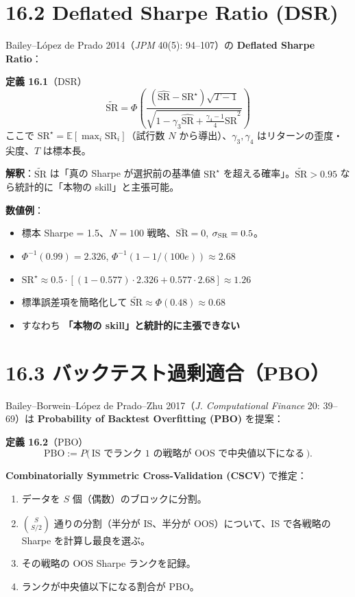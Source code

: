 \documentclass[11pt,a4paper]{report}
\begin{document}
\section{16.2 Deflated Sharpe Ratio (DSR)}

Bailey–López de Prado 2014（\emph{JPM} 40(5): 94–107）の \textbf{Deflated Sharpe Ratio}：

\textbf{定義 16.1}（DSR） \[ \boxed{\; \widetilde{\mathrm{SR}} = \Phi\!\left( \frac{(\widehat{\mathrm{SR}} - \mathrm{SR}^\star) \sqrt{T - 1}}{\sqrt{1 - \gamma_3 \widehat{\mathrm{SR}} + \tfrac{\gamma_4 - 1}{4} \widehat{\mathrm{SR}}^2}}\right) \;} \] ここで $\mathrm{SR}^\star = \mathbb{E}[\max_i \mathrm{SR}_i]$（試行数 $N$ から導出）、$\gamma_3, \gamma_4$ はリターンの歪度・尖度、$T$ は標本長。

\textbf{解釈}：$\widetilde{\mathrm{SR}}$ は「真の Sharpe が選択前の基準値 $\mathrm{SR}^\star$ を超える確率」。$\widetilde{\mathrm{SR}} > 0.95$ なら統計的に「本物の skill」と主張可能。

\textbf{数値例}：
\begin{itemize}
\item 標本 Sharpe = 1.5、$N = 100$ 戦略、$\bar{\mathrm{SR}} = 0$, $\sigma_{\rm SR} = 0.5$。
\item $\Phi^{-1}(0.99) = 2.326$, $\Phi^{-1}(1 - 1/(100 e)) \approx 2.68$
\item $\mathrm{SR}^\star \approx 0.5 \cdot [(1 - 0.577) \cdot 2.326 + 0.577 \cdot 2.68] \approx 1.26$
\item 標準誤差項を簡略化して $\widetilde{\mathrm{SR}} \approx \Phi(0.48) \approx 0.68$
\item すなわち \textbf{「本物の skill」と統計的に主張できない}
\end{itemize}

\section{16.3 バックテスト過剰適合（PBO）}

Bailey–Borwein–López de Prado–Zhu 2017（\emph{J. Computational Finance} 20: 39–69）は \textbf{Probability of Backtest Overfitting (PBO)} を提案：

\textbf{定義 16.2}（PBO） \[ \mathrm{PBO} := P\bigl(\,\text{IS でランク 1 の戦略が OOS で中央値以下になる}\,\bigr). \]

\textbf{Combinatorially Symmetric Cross-Validation (CSCV)} で推定：
\begin{enumerate}
\item データを $S$ 個（偶数）のブロックに分割。
\item $\binom{S}{S/2}$ 通りの分割（半分が IS、半分が OOS）について、IS で各戦略の Sharpe を計算し最良を選ぶ。
\item その戦略の OOS Sharpe ランクを記録。
\item ランクが中央値以下になる割合が PBO。
\end{enumerate}
\end{document}
